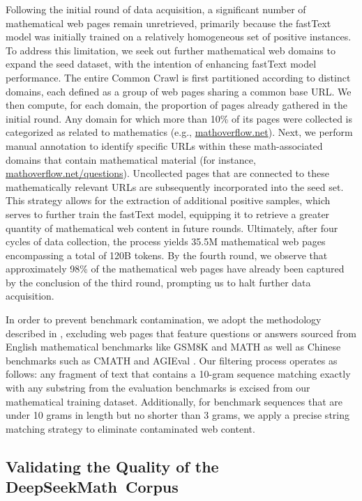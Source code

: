 \begin{itemize}[topsep=0pt]
Following the initial round of data acquisition, a significant number of mathematical web pages remain unretrieved, primarily because the fastText model was initially trained on a relatively homogeneous set of positive instances. To address this limitation, we seek out further mathematical web domains to expand the seed dataset, with the intention of enhancing fastText model performance. The entire Common Crawl is first partitioned according to distinct domains, each defined as a group of web pages sharing a common base URL. We then compute, for each domain, the proportion of pages already gathered in the initial round. Any domain for which more than 10\% of its pages were collected is categorized as related to mathematics (e.g., \url{mathoverflow.net}). 
Next, we perform manual annotation to identify specific URLs within these math-associated domains that contain mathematical material (for instance, \url{mathoverflow.net/questions}). Uncollected pages that are connected to these mathematically relevant URLs are subsequently incorporated into the seed set. This strategy allows for the extraction of additional positive samples, which serves to further train the fastText model, equipping it to retrieve a greater quantity of mathematical web content in future rounds. Ultimately, after four cycles of data collection, the process yields 35.5M mathematical web pages encompassing a total of 120B tokens. By the fourth round, we observe that approximately 98\% of the mathematical web pages have already been captured by the conclusion of the third round, prompting us to halt further data acquisition.

In order to prevent benchmark contamination, we adopt the methodology described in \cite{deepseek-coder}, excluding web pages that feature questions or answers sourced from English mathematical benchmarks like GSM8K \citep{gsm8k} and MATH \citep{MATH} as well as Chinese benchmarks such as CMATH \citep{wei2023cmath} and AGIEval \citep{agieval}. Our filtering process operates as follows: any fragment of text that contains a 10-gram sequence matching exactly with any substring from the evaluation benchmarks is excised from our mathematical training dataset. Additionally, for benchmark sequences that are under 10 grams in length but no shorter than 3 grams, we apply a precise string matching strategy to eliminate contaminated web content.

\subsection{Validating the Quality of the DeepSeekMath~Corpus}


\end{itemize}
